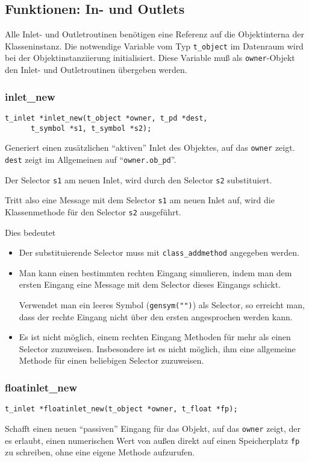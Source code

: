 \documentclass[12pt, a4paper,austrian, titlepage]{article}
\begin{document}
\begin{appendix}
\subsection{Funktionen: In- und Outlets}
Alle Inlet- und Outletroutinen benötigen eine Referenz auf die Objektinterna
der Klasseninstanz.
Die notwendige Variable vom Typ \verb+t_object+ im Datenraum wird bei der
Objektinstanziierung initialisiert.
Diese Variable muß als \verb+owner+-Objekt den Inlet- und Outletroutinen übergeben werden.

\subsubsection{inlet\_new}
\begin{verbatim}
t_inlet *inlet_new(t_object *owner, t_pd *dest,
      t_symbol *s1, t_symbol *s2);
\end{verbatim}
Generiert einen zusätzlichen ``aktiven'' Inlet des Objektes, auf das \verb+owner+ zeigt.
\verb+dest+ zeigt im Allgemeinen auf ``\verb+owner.ob_pd+''.

Der Selector \verb+s1+ am neuen Inlet, wird durch den Selector \verb+s2+ substituiert.

Tritt also eine Message mit dem Selector \verb+s1+ am neuen Inlet auf,
wird die Klassenmethode für den Selector \verb+s2+ ausgeführt.

Dies bedeutet
\begin{itemize}
\item Der substituierende Selector muss mit \verb+class_addmethod+ angegeben werden.
\item Man kann einen bestimmten rechten Eingang simulieren,
indem man dem ersten Eingang eine Message mit dem Selector dieses Eingangs schickt.

Verwendet man ein leeres Symbol (\verb+gensym("")+) als Selector,
so erreicht man, dass der rechte Eingang nicht über den ersten angesprochen werden kann.
\item Es ist nicht möglich, einem rechten Eingang Methoden für mehr als einen Selector
zuzuweisen. Insbesondere ist es nicht möglich, ihm eine allgemeine Methode
für einen beliebigen Selector zuzuweisen.
\end{itemize}

\subsubsection{floatinlet\_new}
\begin{verbatim}
t_inlet *floatinlet_new(t_object *owner, t_float *fp);
\end{verbatim}
Schafft einen neuen ``passiven'' Eingang für das Objekt, auf das \verb+owner+ zeigt,
der es erlaubt, einen numerischen Wert von außen direkt auf einen 
Speicherplatz \verb+fp+ zu schreiben, ohne eine eigene Methode aufzurufen.


\end{appendix}
\end{document}
